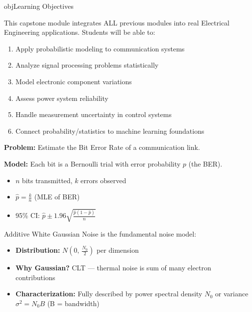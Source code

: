 \begin{PSbox}[unbreakable]{obj}{Learning Objectives}

This capstone module integrates ALL previous modules into real Electrical Engineering applications. Students will be able to:

\begin{enumerate}
\def\labelenumi{\arabic{enumi}.}
\tightlist
\item
  Apply probabilistic modeling to communication systems
\item
  Analyze signal processing problems statistically
\item
  Model electronic component variations
\item
  Assess power system reliability
\item
  Handle measurement uncertainty in control systems
\item
  Connect probability/statistics to machine learning foundations
\end{enumerate}

\end{PSbox}



\textbf{Problem:} Estimate the Bit Error Rate of a communication link.

\textbf{Model:} Each bit is a Bernoulli trial with error probability $p$ (the BER).

\begin{itemize}
\tightlist
\item
  $n$ bits transmitted, $k$ errors observed
\item
  $\hat{p} = \frac{k}{n}$ (MLE of BER)
\item
  95\% CI: $\hat{p} \pm 1.96\sqrt{\frac{\hat{p}(1-\hat{p})}{n}}$
\end{itemize}


Additive White Gaussian Noise is the fundamental noise model:

\begin{itemize}
\tightlist
\item
  \textbf{Distribution:} $N\left(0,\, \frac{N_{0}}{2}\right)$ per dimension
\item
  \textbf{Why Gaussian?} CLT — thermal noise is sum of many electron contributions
\item
  \textbf{Characterization:} Fully described by power spectral density $N_{0}$ or variance $\sigma^{2} = N_{0}B$ (B = bandwidth)
\end{itemize}

